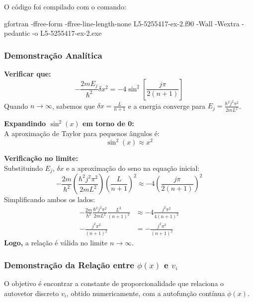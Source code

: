 \documentclass[12pt, a4paper]{article} %
\begin{document}
        O c\'odigo foi compilado com o comando:

gfortran -ffree-form -ffree-line-length-none L5-5255417-ex-2.f90 -Wall -Wextra -pedantic -o L5-5255417-ex-2.exe

            \subsubsection{Demonstra\c{c}\~ao Anal\'itica}

                \textbf{Verificar que:}
                $$-\frac{2mE_j}{\hbar^2}\delta x^2 = -4\sin^2\left[\frac{j\pi}{2(n+1)}\right]$$
                Quando $n \rightarrow \infty$, sabemos que $\delta x = \frac{L}{n+1}$ e a energia converge para $E_j = \frac{\hbar^2j^2\pi^2}{2mL^2}$.

                \vspace{1em}
                \noindent
                \textbf{Expandindo $\sin^2(x)$ em torno de 0:}
                \\
                A aproximação de Taylor para pequenos ângulos é:
                $$\sin^2(x) \approx x^2$$

                \vspace{1em}
                \noindent
                \textbf{Verificação no limite:}
                \\
                Substituindo $E_j$, $\delta x$ e a aproximação do seno na equação inicial:
                $$-\frac{2m}{\hbar^2}\left(\frac{\hbar^2j^2\pi^2}{2mL^2}\right)\left(\frac{L}{n+1}\right)^2 \approx -4\left(\frac{j\pi}{2(n+1)}\right)^2$$
                Simplificando ambos os lados:
                \begin{align*}
                -\frac{2m}{\hbar^2}\frac{\hbar^2j^2\pi^2}{2mL^2}\frac{L^2}{(n+1)^2} &\approx -4\frac{j^2\pi^2}{4(n+1)^2} \\
                -\frac{j^2\pi^2}{(n+1)^2} &= -\frac{j^2\pi^2}{(n+1)^2}
                \end{align*}
                \textbf{Logo,} a relação é válida no limite $n \rightarrow \infty$.

            \subsubsection{Demonstração da Relação entre $\phi(x)$ e $v_i$}

                O objetivo é encontrar a constante de proporcionalidade que relaciona o autovetor discreto $v_i$, obtido numericamente, com a autofunção contínua $\phi(x)$.
\end{document}
